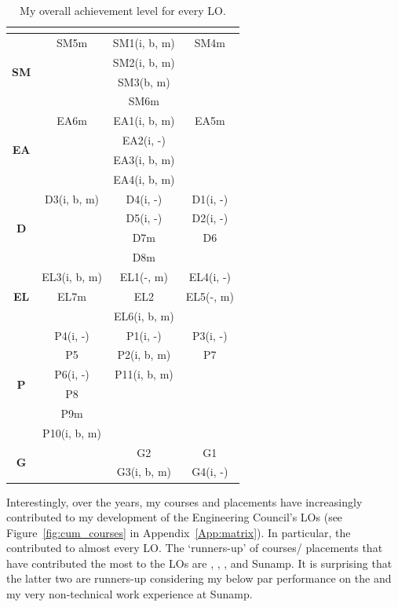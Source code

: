 \begin{table}[htbp]
	\caption{My overall achievement level for every LO.}
	\label{tbl:LOs_summary}
	\centering
	\begin{tabular}{@{}cccc@{}}
		\toprule
		\textbf{} & \littlemaster & \nomaster & \master \\ \midrule
		\multirow{4}{*}{\textbf{SM}} & SM5m & SM1(i, b, m) & SM4m \\
		&  & SM2(i, b, m) &  \\
		&  & SM3(b, m) &  \\
		&  & SM6m &  \\ \midrule
		\multirow{4}{*}{\textbf{EA}} & EA6m & EA1(i, b, m) & EA5m \\
		&  & EA2(i, -) &  \\
		&  & EA3(i, b, m) &  \\
		&  & EA4(i, b, m) &  \\ \midrule
		\multirow{4}{*}{\textbf{D}} & D3(i, b, m) & D4(i, -) & D1(i, -) \\
		&  & D5(i, -) & D2(i, -) \\
		&  & D7m & D6 \\
		&  & D8m &  \\ \midrule
		\multirow{3}{*}{\textbf{EL}} & EL3(i, b, m) & EL1(-, m) & EL4(i, -) \\
		& EL7m & EL2 & EL5(-, m) \\
		&  & EL6(i, b, m) &  \\ \midrule
		\multirow{6}{*}{\textbf{P}} & P4(i, -) & P1(i, -) & P3(i, -) \\
		& P5 & P2(i, b, m) & P7 \\
		& P6(i, -) & P11(i, b, m) &  \\
		& P8 &  &  \\
		& P9m &  &  \\
		& P10(i, b, m) &  &  \\ \midrule
		\multirow{2}{*}{\textbf{G}} &  & G2 & G1 \\
		&  & G3(i, b, m) & G4(i, -) \\ \bottomrule
	\end{tabular}
\end{table}


Interestingly, over the years, my courses and placements have increasingly contributed to my development of the Engineering Council's LOs (see Figure~\ref{fig:cum_courses} in Appendix~\ref{App:matrix}).
In particular, the \LABTitle \space contributed to almost every LO.
The `runners-up' of courses/ placements that have contributed the most to the LOs are \CASTitle, \TPSTitle, \PRJTitle, and Sunamp.
It is surprising that the latter two are runners-up considering my below par performance on the \PRJTitle \space and my very non-technical work experience at Sunamp.






